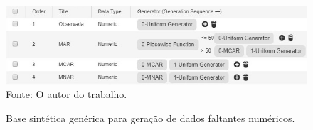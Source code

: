 \documentclass[
	12pt,				%
	openright,			%
	oneside,			%
	a4paper,			%
	english,			%
	brazil				%
	]{abntex2}
\begin{document}
		\begin{figure}[h!]
			\centering
			\caption{Base sintética genérica para geração de dados faltantes numéricos.}
			\includegraphics[width=\linewidth]{./figures/Resultados/BaseGenericaModelo.jpg}
			\label{fig:BaseGenerica}
			\footnotesize Fonte: O autor do trabalho.
		\end{figure}

\end{document}
